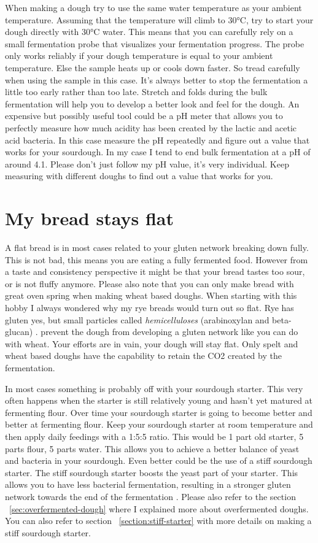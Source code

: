 When making a dough try to use the same water temperature
as your ambient temperature. Assuming that the temperature
will climb to 30°C, try to start your dough directly
with 30°C water. This means that you can carefully rely on
a small fermentation probe that visualizes your fermentation
progress. The probe only works reliably if your dough temperature
is equal to your ambient temperature. Else the sample heats
up or cools down faster. So tread carefully when using
the sample in this case. It's always better to stop
the fermentation a little too early rather than too late.
Stretch and folds during the bulk fermentation
will help you to develop a better look and feel for
the dough. An expensive but possibly useful tool
could be a pH meter that allows you to perfectly
measure how much acidity has been created by the
lactic and acetic acid bacteria. In this case measure
the pH repeatedly and figure out a value that works
for your sourdough. In my case I tend to end bulk
fermentation at a pH of around 4.1. Please don't just
follow my pH value, it's very individual. Keep measuring
with different doughs to find out a value that works for you.

\section{My bread stays flat}

A flat bread is in most cases related to your gluten
network breaking down fully. This is not bad, this
means you are eating a fully fermented food. However
from a taste and consistency perspective it might be
that your bread tastes too sour, or is not fluffy anymore.
Please also note that you can only make bread with
great oven spring when making wheat based doughs. When
starting with this hobby I always wondered why my rye
breads would turn out so flat. Rye has gluten yes, but
small particles called {\it hemicelluloses} (arabinoxylan and beta-glucan) \cite{rye-defects}.
prevent the dough from developing a gluten network like you can
do with wheat. Your efforts are in vain, your dough will
stay flat. Only spelt and wheat based doughs have the capability
to retain the CO2 created by the fermentation.

In most cases something is probably off with your
sourdough starter. This very often happens when the starter
is still relatively young and hasn't yet matured
at fermenting flour. Over time your sourdough
starter is going to become better and better at fermenting
flour. Keep your sourdough starter at room temperature
and then apply daily feedings with a 1:5:5 ratio.
This would be 1 part old starter, 5 parts flour,
5 parts water. This allows you to achieve a better
balance of yeast and bacteria in your sourdough.
Even better could be the use of a stiff sourdough
starter. The stiff sourdough starter boosts
the yeast part of your starter. This allows you
to have less bacterial fermentation, resulting
in a stronger gluten network towards the end
of the fermentation \cite{stiff+starter}. Please
also refer to the section ~\ref{sec:overfermented-dough} where
I explained more about overfermented doughs. You can also
refer to section ~\ref{section:stiff-starter} with more details on
making a stiff sourdough starter.

